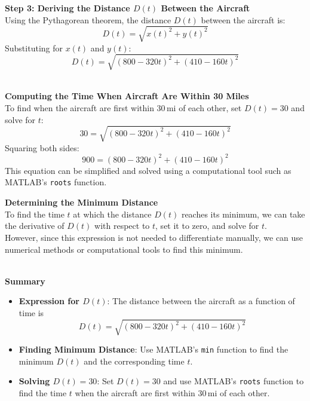 \documentclass[a4paper, 12pt]{report}
\begin{document}
    \textbf{Step 3: Deriving the Distance \( D(t) \) Between the Aircraft}\\[1em]
    Using the Pythagorean theorem, the distance \( D(t) \) between the aircraft is:
    \[D(t) = \sqrt{x(t)^2 + y(t)^2}\]
    Substituting for \( x(t) \) and \( y(t) \):
    \[D(t) = \sqrt{(800 - 320t)^2 + (410 - 160t)^2}\]\\
    \vspace{1em}
    \begin{minipage}{0.45\textwidth}\centering
        \textbf{Computing the Time When Aircraft Are Within 30 Miles}\\[1em]
        To find when the aircraft are first within \( 30 \, \text{mi} \) of each other, set \( D(t) = 30 \) and solve for \( t \):
        \[30 = \sqrt{(800 - 320t)^2 + (410 - 160t)^2}\]
        Squaring both sides:
        \[900 = (800 - 320t)^2 + (410 - 160t)^2\]
        This equation can be simplified and solved using a computational tool such as MATLAB’s \texttt{roots} function.
    \end{minipage}\hfil
    \begin{minipage}{0.44\textwidth}\centering
        \textbf{Determining the Minimum Distance}\\[1em]
        To find the time \( t \) at which the distance \( D(t) \) reaches its minimum, we can take the derivative of \( D(t) \) with respect to \( t \), set it to zero, and solve for \( t \).\\[1em]
        However, since this expression is not needed to differentiate manually, we can use numerical methods or computational tools to find this minimum.\\[1em]
    \end{minipage}\\[2em]
    
    \textbf{Summary}
    \begin{itemize}[itemsep=-0.1cm]
        \item \textbf{Expression for \( D(t) \)}: The distance between the aircraft as a function of time is
        \[D(t) = \sqrt{(800 - 320t)^2 + (410 - 160t)^2}\]
        \item \textbf{Finding Minimum Distance}: Use MATLAB’s \texttt{min} function to find the minimum \( D(t) \) and the corresponding time \( t \).        
        \item \textbf{Solving \( D(t) = 30 \)}: Set \( D(t) = 30 \) and use MATLAB’s \texttt{roots} function to find the time \( t \) when the aircraft are first within \( 30 \, \text{mi} \) of each other.
    \end{itemize}
\end{document}
